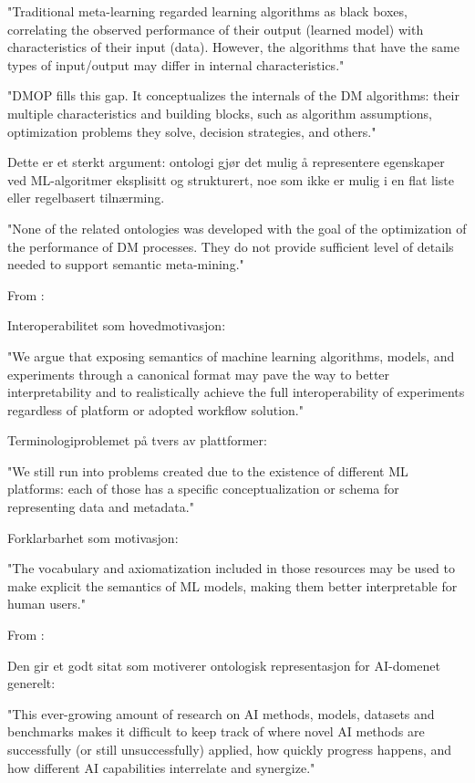 "Traditional meta-learning regarded learning algorithms as black boxes, correlating the observed performance of their output (learned model) with characteristics of their input (data). However, the algorithms that have the same types of input/output may differ in internal characteristics."

"DMOP fills this gap. It conceptualizes the internals of the DM algorithms: their multiple characteristics and building blocks, such as algorithm assumptions, optimization problems they solve, decision strategies, and others."

Dette er et sterkt argument: ontologi gjør det mulig å representere egenskaper ved ML-algoritmer eksplisitt og strukturert, noe som ikke er mulig i en flat liste eller regelbasert tilnærming.

"None of the related ontologies was developed with the goal of the optimization of the performance of DM processes. They do not provide sufficient level of details needed to support semantic meta-mining."

From \parencite{publio2018ml_schema_exposing_semantics_machine_learning_schemas_ontologies} :

Interoperabilitet som hovedmotivasjon:

"We argue that exposing semantics of machine learning algorithms, models, and experiments through a canonical format may pave the way to better interpretability and to realistically achieve the full interoperability of experiments regardless of platform or adopted workflow solution."

Terminologiproblemet på tvers av plattformer:

"We still run into problems created due to the existence of different ML platforms: each of those has a specific conceptualization or schema for representing data and metadata."

Forklarbarhet som motivasjon:

"The vocabulary and axiomatization included in those resources may be used to make explicit the semantics of ML models, making them better interpretable for human users."

From \parencite{blagec2022curated_ontology_based_large_scale_knowledge_graph_ai_tasks_benchmarks} :

Den gir et godt sitat som motiverer ontologisk representasjon for AI-domenet generelt:

"This ever-growing amount of research on AI methods, models, datasets and benchmarks makes it difficult to keep track of where novel AI methods are successfully (or still unsuccessfully) applied, how quickly progress happens, and how different AI capabilities interrelate and synergize."


